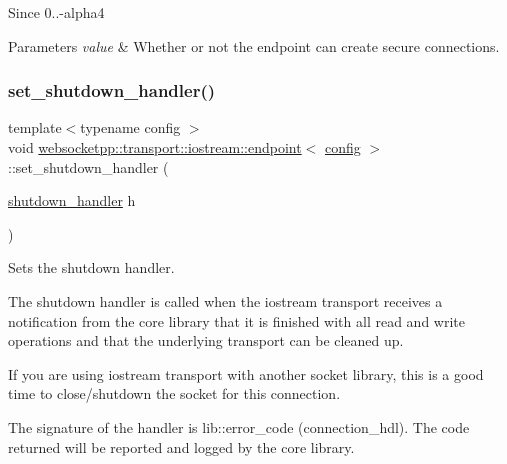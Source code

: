 \begin{DoxySince}{Since}
0..-\/alpha4
\end{DoxySince}

\begin{DoxyParams}{Parameters}
{\em value} & Whether or not the endpoint can create secure connections. \\
\hline
\end{DoxyParams}
\mbox{\label{classwebsocketpp_1_1transport_1_1iostream_1_1endpoint_a2ba3290fe7688190c2e85143f52d88cc}} 
\subsubsection{\texorpdfstring{set\+\_\+shutdown\+\_\+handler()}{set\_shutdown\_handler()}}
{\footnotesize\ttfamily template$<$typename config $>$ \\
void \mbox{\hyperlink{classwebsocketpp_1_1transport_1_1iostream_1_1endpoint}{websocketpp\+::transport\+::iostream\+::endpoint}}$<$ \mbox{\hyperlink{classconfig}{config}} $>$\+::set\+\_\+shutdown\+\_\+handler (\begin{DoxyParamCaption}\item[{\mbox{\hyperlink{namespacewebsocketpp_1_1transport_1_1iostream_a3563ce2cca06b1466f7d76ecb8eb4a0b}{shutdown\+\_\+handler}}}]{h }\end{DoxyParamCaption})\hspace{0.3cm}{\ttfamily [inline]}}



Sets the shutdown handler. 

The shutdown handler is called when the iostream transport receives a notification from the core library that it is finished with all read and write operations and that the underlying transport can be cleaned up.

If you are using iostream transport with another socket library, this is a good time to close/shutdown the socket for this connection.

The signature of the handler is lib\+::error\+\_\+code (connection\+\_\+hdl). The code returned will be reported and logged by the core library.

